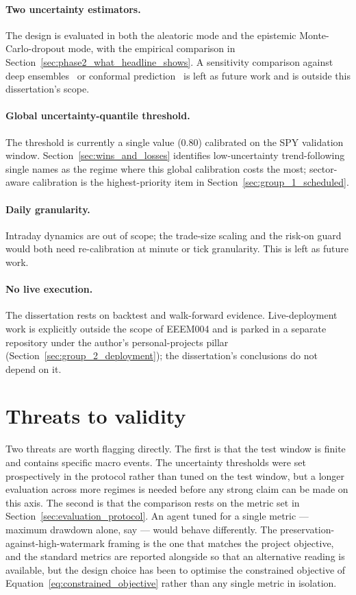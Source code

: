\paragraph{Two uncertainty estimators.} The design is evaluated in both the aleatoric mode and the epistemic Monte-Carlo-dropout mode, with the empirical comparison in Section~\ref{sec:phase2_what_headline_shows}. A sensitivity comparison against deep ensembles~\parencite{lakshminarayanan2017simple} or conformal prediction~\parencite{vovk2005algorithmic} is left as future work and is outside this dissertation's scope.

\paragraph{Global uncertainty-quantile threshold.} The threshold is currently a single value (0.80) calibrated on the SPY validation window. Section~\ref{sec:wins_and_losses} identifies low-uncertainty trend-following single names as the regime where this global calibration costs the most; sector-aware calibration is the highest-priority item in Section~\ref{sec:group_1_scheduled}.

\paragraph{Daily granularity.} Intraday dynamics are out of scope; the trade-size scaling and the risk-on guard would both need re-calibration at minute or tick granularity. This is left as future work.

\paragraph{No live execution.} The dissertation rests on backtest and walk-forward evidence. Live-deployment work is explicitly outside the scope of EEEM004 and is parked in a separate repository under the author's personal-projects pillar (Section~\ref{sec:group_2_deployment}); the dissertation's conclusions do not depend on it.

\section{Threats to validity}
\label{sec:threats_to_validity}

Two threats are worth flagging directly. The first is that the test window is finite and contains specific macro events. The uncertainty thresholds were set prospectively in the protocol rather than tuned on the test window, but a longer evaluation across more regimes is needed before any strong claim can be made on this axis. The second is that the comparison rests on the metric set in Section~\ref{sec:evaluation_protocol}. An agent tuned for a single metric --- maximum drawdown alone, say --- would behave differently. The preservation-against-high-watermark framing is the one that matches the project objective, and the standard metrics are reported alongside so that an alternative reading is available, but the design choice has been to optimise the constrained objective of Equation~\ref{eq:constrained_objective} rather than any single metric in isolation.
